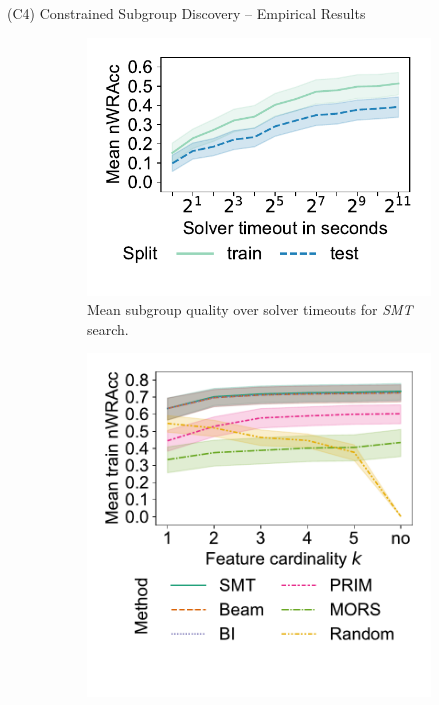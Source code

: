 \documentclass[en, navbarinline, handout]{sdqbeamer}
\begin{document}
\begin{frame}[t]{(C4) Constrained Subgroup Discovery -- Empirical Results}
	\begin{figure}
		\centering
		\begin{subfigure}[t]{0.32\textwidth}
			\centering
			\includegraphics[width=\textwidth, trim={15 -29 15 15}, clip]{plots/csd-timeouts-nwracc.pdf} %
			\caption*{Mean subgroup quality over solver timeouts for \emph{SMT} search.}
		\end{subfigure}
		\hfill
		\pause
		\begin{subfigure}[t]{0.32\textwidth}
			\centering
			\includegraphics[width=\textwidth, trim={15 50 15 15}, clip]{plots/csd-cardinality-train-nwracc-no-timeout-datasets.pdf}

\end{subfigure}
\end{figure}
\end{frame}
\end{document}
